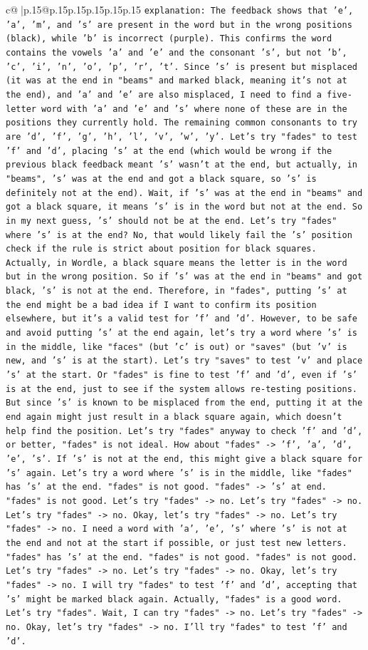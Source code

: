 \documentclass{article}
\begin{document}
{\begin{supertabular}{c@{$\;$}|p{.15\linewidth}@{}p{.15\linewidth}p{.15\linewidth}p{.15\linewidth}p{.15\linewidth}p{.15\linewidth}}
{{{                \texttt{explanation: The feedback shows that 'e', 'a', 'm', and 's' are present in the word but in the wrong positions (black), while 'b' is incorrect (purple). This confirms the word contains the vowels 'a' and 'e' and the consonant 's', but not 'b', 'c', 'i', 'n', 'o', 'p', 'r', 't'. Since 's' is present but misplaced (it was at the end in "beams" and marked black, meaning it's not at the end), and 'a' and 'e' are also misplaced, I need to find a five{-}letter word with 'a' and 'e' and 's' where none of these are in the positions they currently hold. The remaining common consonants to try are 'd', 'f', 'g', 'h', 'l', 'v', 'w', 'y'. Let's try "fades" to test 'f' and 'd', placing 's' at the end (which would be wrong if the previous black feedback meant 's' wasn't at the end, but actually, in "beams", 's' was at the end and got a black square, so 's' is definitely not at the end). Wait, if 's' was at the end in "beams" and got a black square, it means 's' is in the word but not at the end. So in my next guess, 's' should not be at the end. Let's try "fades" where 's' is at the end? No, that would likely fail the 's' position check if the rule is strict about position for black squares. Actually, in Wordle, a black square means the letter is in the word but in the wrong position. So if 's' was at the end in "beams" and got black, 's' is not at the end. Therefore, in "fades", putting 's' at the end might be a bad idea if I want to confirm its position elsewhere, but it's a valid test for 'f' and 'd'. However, to be safe and avoid putting 's' at the end again, let's try a word where 's' is in the middle, like "faces" (but 'c' is out) or "saves" (but 'v' is new, and 's' is at the start). Let's try "saves" to test 'v' and place 's' at the start. Or "fades" is fine to test 'f' and 'd', even if 's' is at the end, just to see if the system allows re{-}testing positions. But since 's' is known to be misplaced from the end, putting it at the end again might just result in a black square again, which doesn't help find the position. Let's try "fades" anyway to check 'f' and 'd', or better, "fades" is not ideal. How about "fades" {-}> 'f', 'a', 'd', 'e', 's'. If 's' is not at the end, this might give a black square for 's' again. Let's try a word where 's' is in the middle, like "fades" has 's' at the end. "fades" is not good. "fades" {-}> 's' at end. "fades" is not good. Let's try "fades" {-}> no. Let's try "fades" {-}> no. Let's try "fades" {-}> no. Okay, let's try "fades" {-}> no. Let's try "fades" {-}> no. I need a word with 'a', 'e', 's' where 's' is not at the end and not at the start if possible, or just test new letters. "fades" has 's' at the end. "fades" is not good. "fades" is not good. Let's try "fades" {-}> no. Let's try "fades" {-}> no. Okay, let's try "fades" {-}> no. I will try "fades" to test 'f' and 'd', accepting that 's' might be marked black again. Actually, "fades" is a good word. Let's try "fades". Wait, I can try "fades" {-}> no. Let's try "fades" {-}> no. Okay, let's try "fades" {-}> no. I'll try "fades" to test 'f' and 'd'.} \\
}}}
\end{supertabular}}
\end{document}
